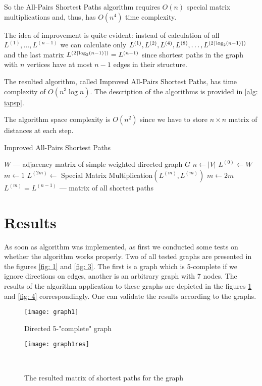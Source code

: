 \documentclass[12pt, bachelor, substylefile = algo_title.rtx]{disser}
\DeclarePairedDelimiter\ceil{\lceil}{\rceil}
\theoremstyle{definition}
\begin{document}
So the All-Pairs Shortest Paths algorithm requires $O(n)$ special matrix multiplications and, thus, has $O(n^4)$ time complexity.

The idea of improvement is quite evident: instead of calculation of all $L^{(1)}, \dots, L^{(n-1)}$ we can calculate only $L^{(1)}, L^{(2)}, L^{(4)}, L^{(8)}, \dots, L^{(2 \ceil{\log_2(n-1)})}$ and the last matrix $ L^{(2 \ceil{\log_2(n-1)})} = L^{(n-1)}$ since shortest paths in the graph with $n$ vertices have at most $n-1$ edges in their structure.

The resulted algorithm, called Improved All-Pairs Shortest Paths, has time complexity of $O(n^3 \log n)$. The description of the algorithms is provided in \ref{alg: iapsp}.

The algorithm space complexity is $O(n^2)$ since we have to store $n\times n$ matrix of distances at each step.

\begin{algorithm}[!h]
\caption{Improved All-Pairs Shortest Paths}
\label{alg: iapsp}
\begin{algorithmic}
\Require $W$ --- adjacency matrix of simple weighted directed graph $G$
\State $n \gets |V|$
\State $L^{(0)} \gets W$
\State $m \gets 1$
	\State $L^{(2m)} \gets $ Special Matrix Multiplication$(L^{(m)}, L^{(m)})$
	\State $m \gets 2m$
\EndWhile
\Ensure $L^{(m)} = L^{(n-1)}$ --- matrix of all shortest paths
\end{algorithmic}
\end{algorithm}

\section{Results}

As soon as algorithm was implemented, as first we conducted some tests on whether the algorithm works properly. Two of all tested graphs are presented in the figures \ref{fig: 1} and \ref{fig: 3}. The first is a graph which is 5-complete if we ignore directions on edges, another is an arbitrary graph with 7 nodes. The results of the algorithm application to these graphs are depicted in the figures \ref{fig: 2} and \ref{fig: 4} correspondingly. 
One can validate the results according to the graphs. 

\begin{figure}[!h]
   \begin{minipage}{0.48\textwidth}
     \centering
     \texttt{[image: graph1]}
	\caption{Directed 5-"complete" graph}
	\label{fig: 1}
   \end{minipage}\hfill
   \begin{minipage}{0.48\textwidth}
     \centering
     \texttt{[image: graph1res]}
	\caption{The resulted matrix of shortest paths for the graph}
	\label{fig: 2}
   \end{minipage}\\
\end{figure}
\end{document}
